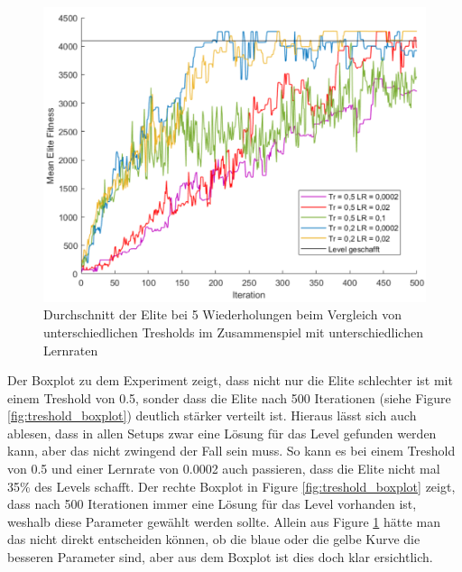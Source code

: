 \documentclass{hbrs-ecta-report}
\begin{document}
\begin{figure}[h!]
	\centering
	\includegraphics[width=\linewidth]{img/Mario_Treshold.png}
	\caption{Durchschnitt der Elite bei 5 Wiederholungen beim Vergleich von unterschiedlichen Tresholds im Zusammenspiel mit unterschiedlichen Lernraten}
	\label{fig:treshold} 
\end{figure}

Der Boxplot zu dem Experiment zeigt, dass nicht nur die Elite schlechter ist mit einem Treshold von 0.5, sonder dass die Elite nach 500 Iterationen (siehe Figure \ref{fig:treshold_boxplot}) deutlich stärker verteilt ist. Hieraus lässt sich auch ablesen, dass in allen Setups zwar eine Lösung für das Level gefunden werden kann, aber das nicht zwingend der Fall sein muss. So kann es bei einem Treshold von 0.5 und einer Lernrate von 0.0002 auch passieren, dass die Elite nicht mal 35\% des Levels schafft. Der rechte Boxplot in Figure \ref{fig:treshold_boxplot} zeigt, dass nach 500 Iterationen immer eine Lösung für das Level vorhanden ist, weshalb diese Parameter gewählt werden sollte. Allein aus Figure \ref{fig:treshold} hätte man das nicht direkt entscheiden können, ob die blaue oder die gelbe Kurve die besseren Parameter sind, aber aus dem Boxplot ist dies doch klar ersichtlich.\\
\end{document}
